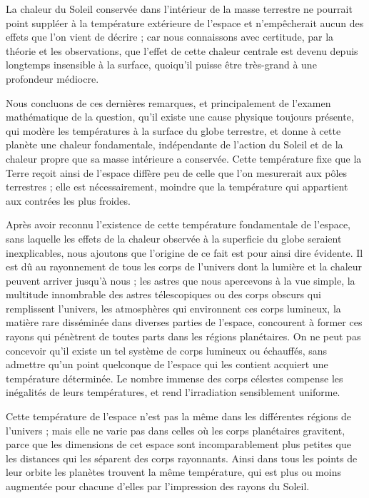 \documentclass[a4paper, 11pt, oneside]{article}
\begin{document}
La chaleur du Soleil conservée dans l'intérieur de la masse terrestre ne pourrait point suppléer à la température extérieure de l'espace et n'empêcherait aucun des effets que l'on vient de décrire ; car nous connaissons avec certitude, par la théorie et les observations, que l'effet de cette chaleur centrale est devenu depuis longtemps insensible à la surface, quoiqu'il puisse être très-grand à une profondeur médiocre.

Nous concluons de ces dernières remarques, et principalement de l'examen mathématique de la question, qu'il existe une cause physique toujours présente, qui modère les températures à la surface du globe terrestre, et donne à cette planète une chaleur fondamentale, indépendante de l'action du Soleil et de la chaleur propre que sa masse intérieure a conservée. Cette température fixe que la Terre reçoit ainsi de l'espace diffère peu de celle que l'on mesurerait aux pôles terrestres ; elle est nécessairement, moindre que la température qui appartient aux contrées les plus froides.

Après avoir reconnu l'existence de cette température fondamentale de l'espace, sans laquelle les effets de la chaleur observée à la superficie du globe seraient inexplicables, nous ajoutons que l'origine de ce fait est pour ainsi dire évidente. Il est dû au rayonnement de tous les corps de l'univers dont la lumière et la chaleur peuvent arriver jusqu'à nous ; les astres que nous apercevons à la vue simple, la multitude innombrable des astres télescopiques ou des corps obscurs qui remplissent l'univers, les atmosphères qui environnent ces corps lumineux, la matière rare disséminée dans diverses parties de l'espace, concourent à former ces rayons qui pénètrent de toutes parts dans les régions planétaires. On ne peut pas concevoir qu'il existe un tel système de corps lumineux ou échauffés, sans admettre qu'un point quelconque de l'espace qui les contient acquiert une température déterminée. Le nombre immense des corps célestes compense les inégalités de leurs températures, et rend l'irradiation sensiblement uniforme.

Cette température de l'espace n'est pas la même dans les différentes régions de l'univers ; mais elle ne varie pas dans celles où les corps planétaires gravitent, parce que les dimensions de cet espace sont incomparablement plus petites que les distances qui les séparent des corps rayonnants. Ainsi dans tous les points de leur orbite les planètes trouvent la même température, qui est plus ou moins augmentée pour chacune d'elles par l'impression des rayons du Soleil.
\end{document}

